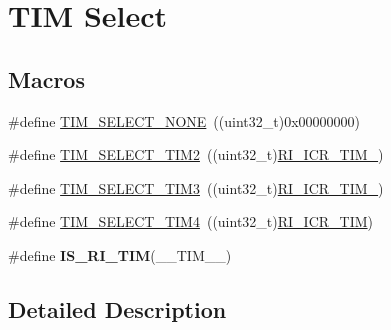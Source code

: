 \hypertarget{group___t_i_m___select}{\section{T\-I\-M Select}
\label{group___t_i_m___select}
}
\subsection*{Macros}
\begin{DoxyCompactItemize}
\item 
\#define \hyperlink{group___t_i_m___select_ga646e3019e83865fa050ddce0b8d3bb99}{T\-I\-M\-\_\-\-S\-E\-L\-E\-C\-T\-\_\-\-N\-O\-N\-E}~((uint32\-\_\-t)0x00000000)
\item 
\#define \hyperlink{group___t_i_m___select_ga3e27a854ea5a487faa34cecbe716f882}{T\-I\-M\-\_\-\-S\-E\-L\-E\-C\-T\-\_\-\-T\-I\-M2}~((uint32\-\_\-t)\hyperlink{group___peripheral___registers___bits___definition_gad850473c75d4ba29f970cc12688e7aca}{R\-I\-\_\-\-I\-C\-R\-\_\-\-T\-I\-M\-\_})
\item 
\#define \hyperlink{group___t_i_m___select_gaf654500d4d845cfc1d89db5ae2b82489}{T\-I\-M\-\_\-\-S\-E\-L\-E\-C\-T\-\_\-\-T\-I\-M3}~((uint32\-\_\-t)\hyperlink{group___peripheral___registers___bits___definition_ga2bfcc48a0dc738636cfaab24db053e74}{R\-I\-\_\-\-I\-C\-R\-\_\-\-T\-I\-M\-\_})
\item 
\#define \hyperlink{group___t_i_m___select_gae19e2277f213cc2eda07c1258d5621af}{T\-I\-M\-\_\-\-S\-E\-L\-E\-C\-T\-\_\-\-T\-I\-M4}~((uint32\-\_\-t)\hyperlink{group___peripheral___registers___bits___definition_ga0b2db345cf0c0710bb1ef69148383eaa}{R\-I\-\_\-\-I\-C\-R\-\_\-\-T\-I\-M})
\item 
\#define {\bfseries I\-S\-\_\-\-R\-I\-\_\-\-T\-I\-M}(\-\_\-\-\_\-\-T\-I\-M\-\_\-\-\_\-)
\end{DoxyCompactItemize}


\subsection{Detailed Description}


